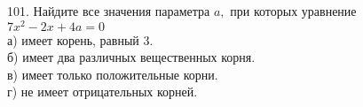 101. Найдите все значения параметра $a,$ при которых уравнение $7x^2-2x+4a=0$\\
а) имеет корень, равный 3.\\
б) имеет два различных вещественных корня.\\
в) имеет только положительные корни.\\
г) не имеет отрицательных корней.\\
